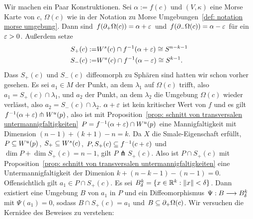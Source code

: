 \begin{bigproof}
    Wir machen ein Paar Konstruktionen. Sei $\alpha := f(c)$ und $(V, \kappa)$ eine Morse Karte von
    $c$, $\Omega(c)$ wie in der Notation zu Morse Umgebungen~\ref{def: notation morse umgebung}. 
    Dann sind $f({ \partial }_+ \Omega (c)) = \alpha + \varepsilon$ und $f({ \partial }_- \Omega (c)) = \alpha - \varepsilon$ für ein 
    $\varepsilon > 0$. Außerdem setze
    \begin{align*}
        S_+ (c) := & { W^s } (c) \cap f^{-1}(\alpha + \varepsilon) \cong S^{n - k - 1} \\
        S_- (c) := & { W^u } (c) \cap f^{-1}(\alpha - \varepsilon) \cong S^{k - 1} .
    \end{align*}
    Dass $S_+ (c)$ und $S_- (c)$ diffeomorph zu Sphären sind hatten wir schon vorher gesehen.
    Es sei $a_1 \in M$ der Punkt, an dem $\lambda_1$ auf $\Omega(c)$ trifft, also 
    $a_1 = S_+ (c) \cap \lambda_1$, und $a_2$ der Punkt, an dem $\lambda_2$ die Umgebung $\Omega (c)$ 
    wieder verlässt, also $a_2 = S_- (c) \cap \lambda_2$. $\alpha + \varepsilon$ ist kein kritischer Wert 
    von $f$ und es gilt $f^{-1}(\alpha + \varepsilon) \pitchfork { W^u } (p)$, also ist mit 
    Proposition~\ref{prop: schnitt von transversalen untermannigfaltigkeiten} 
    $P = f^{-1}(\alpha + \varepsilon) \cap { W^u } (p)$ eine Mannigfaltigkeit mit Dimension 
    $(n - 1) + (k + 1) - n = k$. Da $X$ die Smale-Eigenschaft erfüllt, $P \subseteq { W^u } (p)$,
    $S_+ \subseteq { W^s }(c)$, $P, S_+(c) \subseteq f^{-1}(c + \varepsilon)$ und 
    $\dim P + \dim S_+(c) = n - 1$, gilt $P \pitchfork S_+ (c)$. Also ist $P \cap S_+ (c)$
    mit Proposition~\ref{prop: schnitt von transversalen untermannigfaltigkeiten} eine 
    Untermannigfaltigkeit der Dimenion $k + (n - k - 1) - (n - 1) = 0$. Offensichtlich gilt 
    $a_1 \in P \cap S_+ (c)$. Es sei $B^k_{\delta} = \{ x \in { \mathbb R }^k : \| x \| < \delta \}$. Dann 
    existiert eine Umgebung $B$ von $a_1$ in $P$ und ein Diffeomorphismus 
    $\Psi : B \longrightarrow B^k_{\delta}$ mit $\Psi(a_1) = 0$, sodass $B \cap S_+ (c) = a_1$ 
    und $B \subseteq { \partial }_+ \Omega (c)$. Wir versuchen die Kernidee des Beweises zu verstehen:

    \begin{figure}
        \centering
\end{figure}
\end{bigproof}
